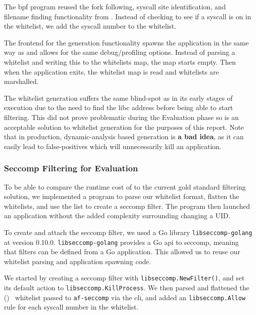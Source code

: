 The \ac{bpf} program reused the fork following, syscall site identification, and
filename finding functionality from \afss. Instead of checking to see if a
syscall is on in the whitelist, we add the syscall number to the whitelist. 

The frontend for the generation functionality spawns the application in the same
way as \af and allows for the same debug/profiling options. Instead of parsing a
whitelist and writing this to the whitelists map, the map starts empty. Then
when the application exits, the whitelist map is read and whitelists are
marshalled.

The whitelist generation suffers the same blind-spot as \af in its early stages
of execution due to the need to find the \ac{libc} address before being able to
start filtering. This did not prove problematic during the Evaluation phase so
is an acceptable solution to whitelist generation for the purposes of this
report. Note that in production, dynamic-analysis based generation is \textbf{a
bad idea}, as it can easily lead to false-positives which will unnecessarily
kill an application.

\subsubsection{Seccomp Filtering for Evaluation}

To be able to compare the runtime cost of \af to the current gold standard
filtering solution, we implemented a program to parse our whitelist format,
flatten the whitelists, and use the list to create a seccomp filter. The program
then launched an application without the added complexity surrounding changing
a UID.

To create and attach the seccomp filter, we used a Go library 
\texttt{libseccomp-golang} at version 0.10.0. \texttt{libseccomp-golang}
provides a Go \ac{api} to seccomp, meaning that filters can be defined from a
Go application. This allowed us to reuse our whitelist parsing and application
spawning code.

We started by creating a seccomp filter with \texttt{libseccomp.NewFilter()}, 
and set its default action to \texttt{libseccomp.KillProcess}. We then parsed
and flattened the (\afss)~ whitelist passed to \texttt{af-seccomp} via the
\ac{cli}, and added an \texttt{libseccomp.Allow} rule for each syscall number in
the whitelist.


